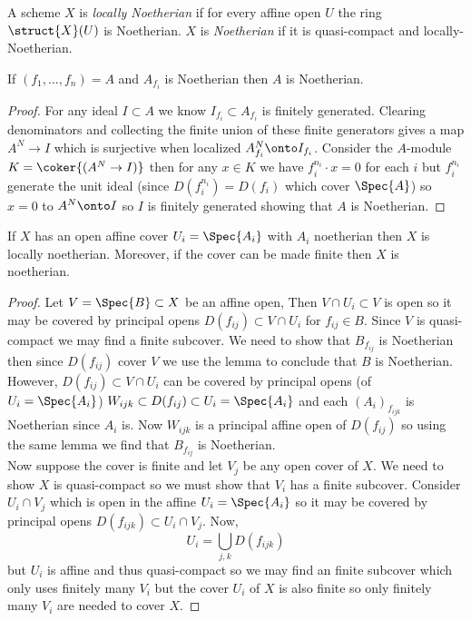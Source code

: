 \documentclass[12pt]{article}
\begin{document}
\begin{defn}
A scheme $X$ is \textit{locally Noetherian} if for every affine open $U$ the ring $\struct{X}(U)$ is Noetherian. $X$ is \textit{Noetherian} if it is quasi-compact and locally-Noetherian. 
\end{defn}

\begin{lemma}
If $(f_1, \dots, f_n) = A$ and $A_{f_i}$ is Noetherian then $A$ is Noetherian.
\end{lemma}

\begin{proof}
For any ideal $I \subset A$ we know $I_{f_i} \subset A_{f_i}$ is finitely generated. Clearing denominators and collecting the finite union of these finite generators gives a map $A^N \to I$ which is surjective when localized $A^N_{f_i} \onto I_{f_i}$. Consider the $A$-module $K = \coker{(A^N \to I)}$ then for any $x \in K$ we have $f_i^{n_i} \cdot x = 0$ for each $i$ but $f_i^{n_i}$ generate the unit ideal (since $D(f_i^{n_i}) = D(f_i)$ which cover $\Spec{A}$) so $x = 0$ to $A^N \onto I$ so $I$ is finitely generated showing that $A$ is Noetherian.
\end{proof}

\begin{lemma}
If $X$ has an open affine cover $U_i = \Spec{A_i}$ with $A_i$ noetherian then $X$ is locally noetherian. Moreover, if the cover can be made finite then $X$ is noetherian. 
\end{lemma}

\begin{proof}
Let $V = \Spec{B} \subset X$ be an affine open, Then $V \cap U_i \subset V$ is open so it may be covered by principal opens $D(f_{ij}) \subset V \cap U_i$ for $f_{ij} \in B$. Since $V$ is quasi-compact we may find a finite subcover. We need to show that $B_{f_{ij}}$ is Noetherian then since $D(f_{ij})$ cover $V$ we use the lemma to conclude that $B$ is Noetherian. However, $D(f_{ij}) \subset V \cap U_i$ can be covered by principal opens (of $U_i = \Spec{A_i}$) $W_{ijk} \subset D(f_{ij}) \subset U_i = \Spec{A_i}$ and each $(A_i)_{f_{ijk}}$ is Noetherian since $A_i$ is. Now $W_{ijk}$ is a principal affine open of $D(f_{ij})$ so using the same lemma we find that $B_{f_{ij}}$ is Noetherian.
\bigskip\\
Now suppose the cover is finite and let $V_j$ be any open cover of $X$. We need to show $X$ is quasi-compact so we must show that $V_i$ has a finite subcover. Consider $U_i \cap V_j$  which is open in the affine $U_i = \Spec{A_i}$ so it may be covered by principal opens $D(f_{ijk}) \subset U_i \cap V_j$. Now,
\[ U_i = \bigcup_{j,k} D(f_{ijk}) \]
but $U_i$ is affine and thus quasi-compact so we may find an finite subcover which only uses finitely many $V_i$ but the cover $U_i$ of $X$ is also finite so only finitely many $V_i$ are needed to cover $X$.  
\end{proof}
\end{document}
